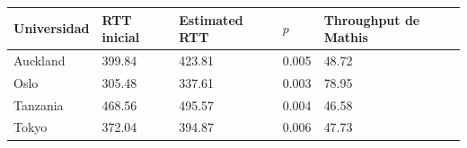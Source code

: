 \documentclass[final,inline,a4paper,narroweqnarray]{ieee}
\begin{document}
\begin{tabular}{| p{1.6cm} | p{1.2cm} | p{1.4cm} | p{1.2cm} | p{1.7cm} |}
  \hline
  Universidad & RTT inicial & Estimated RTT & $p$ & Throughput de Mathis \\
  \hline
  Auckland & 399.84 & 423.81 & 0.005 & 48.72 \\
  Oslo & 305.48 & 337.61 & 0.003 & 78.95 \\
  Tanzania & 468.56 & 495.57 & 0.004 & 46.58 \\
  Tokyo & 372.04 & 394.87 & 0.006 & 47.73 \\
  \hline
\end{tabular}
\end{document}
